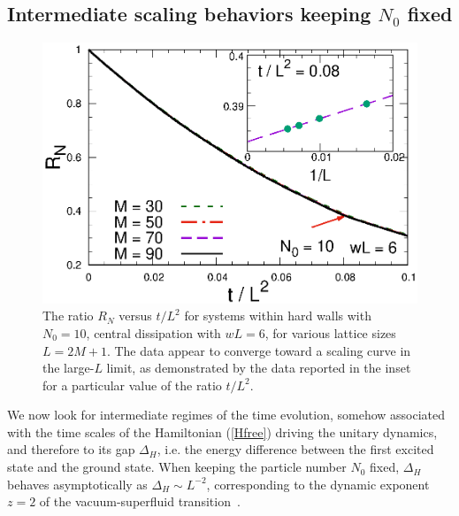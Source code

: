   
  
  
  \subsection{Intermediate scaling behaviors keeping $N_0$ fixed}
  \label{N0fixed}
  
  \begin{figure}[!htb]
\centering
    \includegraphics[width=0.65\columnwidth]{imm/NwL2.eps}
    \caption{The ratio $R_N$ versus $t/L^2$ for systems within hard
      walls with $N_0=10$, central dissipation with $wL=6$, for various
      lattice sizes $L=2M+1$.  The data appear to converge toward a
      scaling curve in the large-$L$ limit, as demonstrated by the data
      reported in the inset for a particular value of the ratio
      $t/L^2$.}
    \label{rntn010ir}
  \end{figure}
  
  We now look for intermediate regimes of the time evolution, somehow
  associated with the time scales of the Hamiltonian (\ref{Hfree})
  driving the unitary dynamics, and therefore to its gap $\Delta_H$,
  i.e. the energy difference between the first excited state and the
  ground state. When keeping the particle number $N_0$ fixed, $\Delta_H$
  behaves asymptotically as $\Delta_H \sim L^{-2}$, corresponding to the
  dynamic exponent $z=2$ of the vacuum-superfluid
  transition~\cite{Sachdev-book}.
  
  
